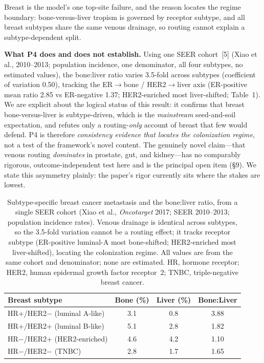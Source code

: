 \documentclass[11pt]{article}
\begin{document}
Breast is the model's one top-site failure, and the reason locates the regime
boundary: bone-versus-liver tropism is governed by receptor subtype, and all
breast subtypes share the same venous drainage, so routing cannot explain a
subtype-dependent split.

\textbf{What P4 does and does not establish.} Using one SEER cohort~[5] (Xiao et al.,
2010--2013; population incidence, one denominator, all four subtypes, no estimated
values), the bone:liver ratio varies 3.5-fold across subtypes (coefficient of
variation 0.50), tracking the ER$\to$bone / HER2$\to$liver axis (ER-positive mean
ratio 2.85 vs ER-negative 1.37; HER2-enriched most liver-shifted; Table~1). We
are explicit about the logical status of this result: it confirms that breast
bone-versus-liver is subtype-driven, which is the \emph{mainstream}
seed-and-soil expectation, and refutes only a routing-\emph{only} account of
breast that few would defend. P4 is therefore \emph{consistency evidence that
locates the colonization regime}, not a test of the framework's novel content.
The genuinely novel claim---that venous routing \emph{dominates} in prostate, gut,
and kidney---has no comparably rigorous, outcome-independent test here and is the
principal open item (\S9). We state this asymmetry plainly: the paper's rigor
currently sits where the stakes are lowest.

\begin{table}[h]
\centering
\begin{tabular}{lccc}
\toprule
Breast subtype & Bone (\%) & Liver (\%) & Bone:Liver \\
\midrule
HR+/HER2$-$ (luminal A-like) & 3.1 & 0.8 & 3.88 \\
HR+/HER2+ (luminal B-like)   & 5.1 & 2.8 & 1.82 \\
HR$-$/HER2+ (HER2-enriched)  & 4.6 & 4.2 & 1.10 \\
HR$-$/HER2$-$ (TNBC)         & 2.8 & 1.7 & 1.65 \\
\bottomrule
\end{tabular}
\caption{Subtype-specific breast cancer metastasis and the bone:liver ratio, from
a single SEER cohort (Xiao et al., \emph{Oncotarget} 2017; SEER 2010--2013;
population incidence rates). Venous drainage is identical across subtypes, so the
3.5-fold variation cannot be a routing effect; it tracks receptor subtype
(ER-positive luminal-A most bone-shifted; HER2-enriched most liver-shifted),
locating the colonization regime. All values are from the same cohort and
denominator; none are estimated. HR, hormone receptor; HER2, human epidermal
growth factor receptor~2; TNBC, triple-negative breast cancer.}
\end{table}
\end{document}
